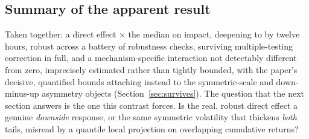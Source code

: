 \subsection{Summary of the apparent result}

Taken together: a direct effect \RatioTailMedImpact$\times$ the median on
impact, deepening to \BetaQoneHtwelve{} by twelve hours, robust across a
battery of robustness checks, surviving multiple-testing correction in full, and
a mechanism-specific interaction not detectably different from zero,
imprecisely estimated rather than tightly bounded, with the paper's
decisive, quantified bounds attaching instead to the symmetric-scale and
down-minus-up asymmetry objects (Section~\ref{sec:survives}). The question that the next
section answers is the one this contrast forces. Is the real, robust
direct effect a genuine \emph{downside} response, or the same symmetric
volatility that thickens \emph{both} tails, misread by a quantile local
projection on overlapping cumulative returns?